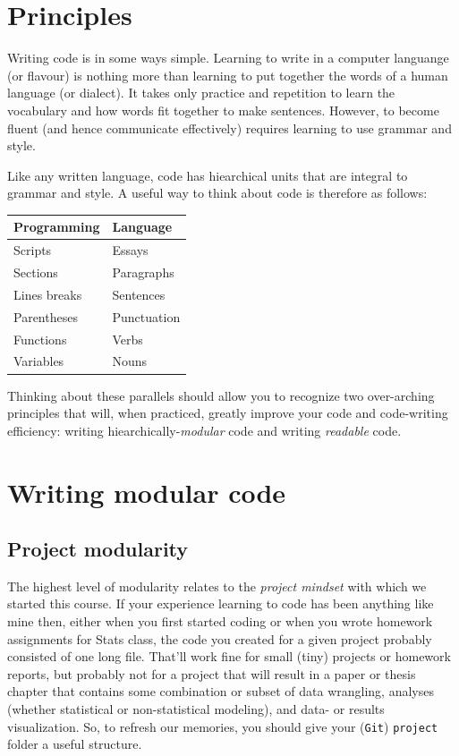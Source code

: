\documentclass[12pt,letterpaper]{article}
\begin{document}
\section{Principles}

Writing code is in some ways simple.
Learning to write in a computer languange (or flavour) is nothing more than learning to put together 
the words of a human language (or dialect).
It takes only practice and repetition to learn the vocabulary and how words fit together to make 
sentences.
However, to become fluent (and hence communicate effectively) requires learning to use grammar 
and style.

Like any written language, code has hiearchical units that are integral to grammar and style.
A useful way to think about code is therefore as follows:

\begin{center}
\begin{tabular}{ll}
	\hline
	Programming	& Language\\
	\hline
	Scripts	& Essays\\
	Sections & Paragraphs\\
	Lines breaks & Sentences\\
	Parentheses & Punctuation\\
	Functions & Verbs\\
	Variables & Nouns\\
	\hline
\end{tabular}
\end{center}
\noindent
Thinking about these parallels should allow you to recognize two over-arching principles that will, 
when practiced, greatly improve your code and code-writing efficiency:
writing hiearchically-\emph{modular} code and writing \emph{readable} code.




\section{Writing modular code}

\subsection{Project modularity}

The highest level of modularity relates to the \emph{project mindset} with which we started this 
course.
If your experience learning to code has been anything like mine then, either when you first started 
coding or when you wrote homework assignments for Stats class,
the code you created for a given project probably consisted of one long file.
That'll work fine for small (tiny) projects or homework reports,
but probably not for a project that will result in a paper or thesis chapter that contains some 
combination or subset of data wrangling,
analyses (whether statistical or non-statistical modeling),
and data- or results visualization.  So, to refresh our memories, you should give your (\texttt{Git}) 
\texttt{project} folder a useful structure.
\end{document}
